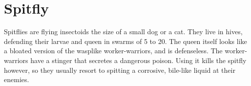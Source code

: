 \section{Spitfly}

Spitflies are flying insectoids the size of a small dog or a cat. They live in hives, defending their larvae and queen in swarms of 5 to 20. The queen itself looks like a bloated version of the wasplike worker-warriors, and is defenseless. The worker-warriors have a stinger that secretes a dangerous poison. Using it kills the spitfly however, so they usually resort to spitting a corrosive, bile-like liquid at their enemies.